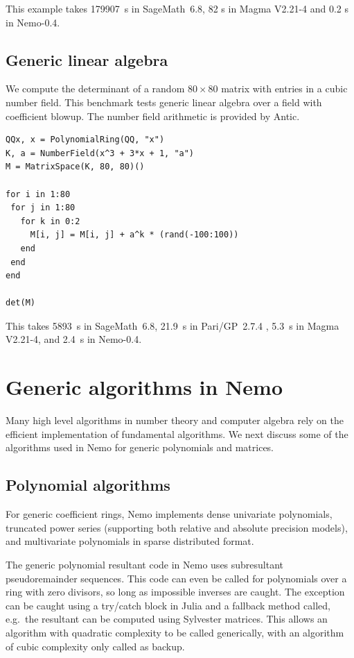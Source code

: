 \documentclass{sig-alternate-05-2015}
\begin{document}
This example takes 179907~s in SageMath~6.8, 82 s in Magma V2.21-4
and 0.2 s in Nemo-0.4.

\subsection{Generic linear algebra}

We compute the determinant of a random $80\times80$ matrix
with entries in a cubic number field.
This benchmark tests generic linear algebra over a field
with coefficient blowup. The number field arithmetic is
provided by Antic.

\begin{verbatim}
QQx, x = PolynomialRing(QQ, "x")
K, a = NumberField(x^3 + 3*x + 1, "a")
M = MatrixSpace(K, 80, 80)()

for i in 1:80
 for j in 1:80
   for k in 0:2
     M[i, j] = M[i, j] + a^k * (rand(-100:100))
   end
 end
end

det(M)
\end{verbatim}

This takes 5893~s in SageMath~6.8, 21.9~s in Pari/GP~2.7.4 \cite{pari}, 5.3~s in Magma V2.21-4,
and 2.4~s in Nemo-0.4.

\section{Generic algorithms in Nemo}
\label{sect:generic}

Many high level algorithms in number theory and computer algebra rely on
the efficient implementation of fundamental algorithms.
We next discuss some of the algorithms
used in Nemo for generic polynomials and matrices.

\subsection{Polynomial algorithms}

For generic coefficient rings, Nemo implements dense univariate polynomials,
truncated power series (supporting both relative and absolute precision models),
and multivariate polynomials in sparse distributed format.

The generic polynomial resultant code in Nemo uses subresultant
pseudoremainder sequences. This code can even be called for polynomials over a
ring with zero divisors, so long as impossible inverses are caught. The exception
can be caught using a try/catch block in Julia and a fallback method called, e.g.\
the resultant can be computed using Sylvester matrices. This allows an algorithm
with quadratic complexity to be called generically, with an algorithm of cubic
complexity only called as backup.
\end{document}
